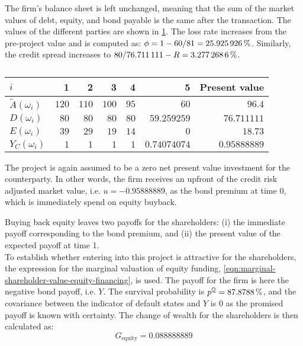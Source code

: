 \documentclass[main.tex]{subfiles}
\begin{document}
            The firm's balance sheet is left unchanged, meaning that the sum of the market values of debt, equity, 
            and bond payable is the same after the transaction. 
            The values of the different parties are shown in \cref{tbl:example-equity-buyback}. 
            The loss rate increases from the pre-project value and is computed as:
            $\phi = 1 - \num{60}/\num{81} = \pct{0.25925926}$.
            Similarly, the credit spread increases to
            $\num{80}/\num{76.711111} - \grossrfrate = \pct{0.032772686}$.
            \begin{table}[H]
                \centering
                \begin{tabular}{l|rrrrr||r}
                    $i$ & 1 & 2 & 3 & 4 & 5 & Present value \\
                    \hline
                    \rule{0pt}{1.1em}
                    $\tilde{A}(\omega_{i})$ & $\num{120}$ & $\num{110}$ & $\num{100}$ & $\num{95}$ & $\num{60}$ & $\num{96.4}$ \\
                    $D(\omega_{i})$ & $\num{80}$ & $\num{80}$ & $\num{80}$ & $\num{80}$ & $\num{59.259259}$ & $\num{76.711111}$ \\
                    $E(\omega_{i})$ & $\num{39}$ & $\num{29}$ & $\num{19}$ & $\num{14}$ & $\num{0}$ & $\num{18.73}$ \\
                    $Y_C(\omega_{i})$ & $\num{1}$ & $\num{1}$ & $\num{1}$ & $\num{1}$ & $\num{0.74074074}$ & $\num{0.95888889}$ \\
                \end{tabular}
                \caption{}
                \label{tbl:example-equity-buyback}
            \end{table}

            The project is again assumed to be a zero net present value investment for the counterparty.
            In other words,
            the firm receives an upfront of the credit risk adjusted market value,
            i.e. $u=\num{-0.95888889}$, as the bond premium at time 0, which is immediately spend on equity buyback.

            Buying back equity leaves two payoffs for the shareholders:
            (i) the immediate payoff corresponding to the bond premium, and
            (ii) the present value of the expected payoff at time 1.
            \\
            To establish whether entering into this project is attractive for the shareholders,
            the expression for the marginal valuation of equity funding, \cref{eqn:marginal-shareholder-value-equity-financing}, is used.
            The payoff for the firm is here the negative bond payoff, i.e. $Y$.
            The survival probability is $p^{\rnmeasure} = \pct{0.878788}$, 
            and the covariance between the indicator of default states and $Y$ is 0 
            as the promised payoff is known with certainty.
            The change of wealth for the shareholders is then calculated as:
            \begin{equation*}
                G_{\text{equity}} = \num{0.088888889}
            \end{equation*}
            
\end{document}
